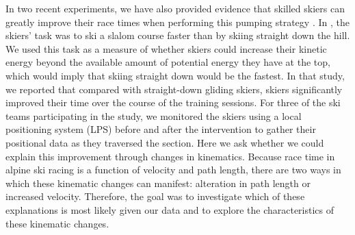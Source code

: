 \documentclass{article}
\begin{document}
In two recent experiments, we have also provided evidence that skilled skiers can greatly improve their race times when performing this pumping strategy   \cite{magelssen_is_2022, christian_magelssen_reinforcement_2024}. In \textcite{magelssen_is_2022}, the skiers' task was to ski a slalom course faster than by skiing straight down the hill. We used this task as a measure of whether skiers could increase their kinetic energy beyond the available amount of potential energy they have at the top, which would imply that skiing straight down would be the fastest. In that study, we reported that compared with straight-down gliding skiers, skiers significantly improved their time over the course of the training sessions. For three of the ski teams participating in the study, we monitored the skiers using a local positioning system (LPS) before and after the intervention to gather their positional data as they traversed the section. Here we ask whether we could explain this improvement through changes in kinematics. Because race time in alpine ski racing is a function of velocity and path length, there are two ways in which these kinematic changes can manifest: alteration in path length or increased velocity. Therefore, the goal was to investigate which of these explanations is most likely given our data and to explore the characteristics of these kinematic changes. 
\end{document}
